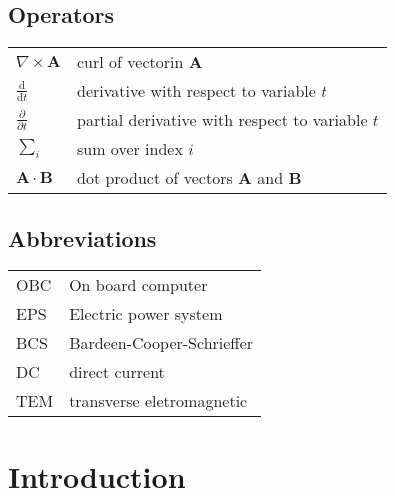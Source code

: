 \documentclass[english,12pt,a4paper,pdftex,elec,utf8]{aaltothesis}
\begin{document}
\subsection*{Operators}

\begin{tabular}{ll}
$\nabla \times \mathbf{A}$              & curl of vectorin $\mathbf{A}$\\
$\displaystyle\frac{\mbox{d}}{\mbox{d} t}$ & derivative with respect to 
variable $t$\\[3mm]
$\displaystyle\frac{\partial}{\partial t}$  & partial derivative with respect 
to variable $t$ \\[3mm]
$\sum_i $                       & sum over index $i$\\
$\mathbf{A} \cdot \mathbf{B}$    & dot product of vectors $\mathbf{A}$ and 
$\mathbf{B}$
\end{tabular}

\subsection*{Abbreviations}

\begin{tabular}{ll}
OBC         & On board computer \\
EPS      & Electric power system \\
BCS        & Bardeen-Cooper-Schrieffer \\ %
DC         & direct current \\
TEM        & transverse eletromagnetic
\end{tabular}


\cleardoublepage
\storeinipagenumber
{}
\setcounter{page}{1}


\section{Introduction}
\end{document}
